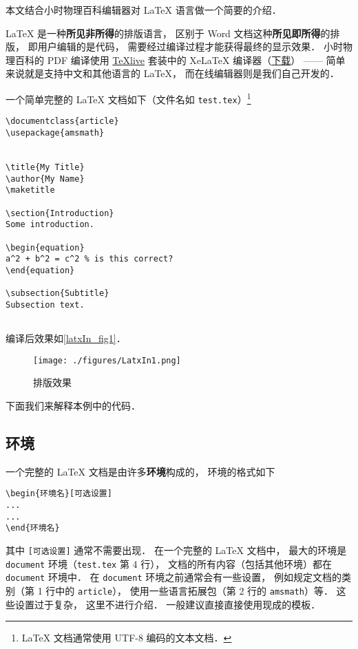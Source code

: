 
本文结合小时物理百科编辑器对 LaTeX 语言做一个简要的介绍．

LaTeX 是一种\textbf{所见非所得}的排版语言， 区别于 Word 文档这种\textbf{所见即所得}的排版， 即用户编辑的是代码， 需要经过编译过程才能获得最终的显示效果． 小时物理百科的 PDF 编译使用 \href{https://www.tug.org/texlive/}{TeXlive} 套装中的 XeLaTeX 编译器（\href{https://www.tug.org/texlive/acquire-iso.html}{下载}）%
—— 简单来说就是支持中文和其他语言的 LaTeX， 而在线编辑器则是我们自己开发的．

一个简单完整的 LaTeX 文档如下（文件名如 \lstinline|test.tex|）\footnote{LaTeX 文档通常使用 UTF-8 编码的文本文档．}
\begin{lstlisting}
\documentclass{article}
\usepackage{amsmath}


\title{My Title}
\author{My Name}
\maketitle

\section{Introduction}
Some introduction.

\begin{equation}
a^2 + b^2 = c^2 % is this correct?
\end{equation}

\subsection{Subtitle}
Subsection text.


\end{lstlisting}

编译后效果如\autoref{latxIn_fig1}．
\begin{figure}[ht]
\centering
\texttt{[image: ./figures/LatxIn1.png]}
\caption{排版效果} \label{latxIn_fig1}
\end{figure}
下面我们来解释本例中的代码．

\subsection{环境}
一个完整的 LaTeX 文档是由许多\textbf{环境}构成的， 环境的格式如下
\begin{lstlisting}
\begin{环境名}[可选设置]
...
...
\end{环境名}
\end{lstlisting}
其中 \lstinline|[可选设置]| 通常不需要出现． 在一个完整的 LaTeX 文档中， 最大的环境是 \lstinline|document| 环境（\lstinline|test.tex| 第 4 行）， 文档的所有内容（包括其他环境）都在 \lstinline|document| 环境中． 在 \lstinline|document| 环境之前通常会有一些设置， 例如规定文档的类别（第 1 行中的 \lstinline|article|）， 使用一些语言拓展包（第 2 行的 \lstinline|amsmath|）等． 这些设置过于复杂， 这里不进行介绍． 一般建议直接直接使用现成的模板．

